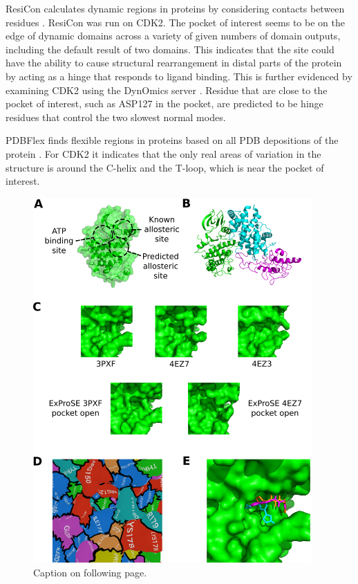ResiCon calculates dynamic regions in proteins by considering contacts between residues \cite{Dziubinski2016}.
ResiCon was run on CDK2.
The pocket of interest seems to be on the edge of dynamic domains across a variety of given numbers of domain outputs, including the default result of two domains.
This indicates that the site could have the ability to cause structural rearrangement in distal parts of the protein by acting as a hinge that responds to ligand binding.
This is further evidenced by examining CDK2 using the DynOmics server \cite{Li2017}.
Residue that are close to the pocket of interest, such as ASP127 in the pocket, are predicted to be hinge residues that control the two slowest normal modes.

PDBFlex finds flexible regions in proteins based on all PDB depositions of the protein \cite{Hrabe2016}.
For CDK2 it indicates that the only real areas of variation in the structure is around the \textalpha C-helix and the T-loop, which is near the pocket of interest.


\begin{figure}
\centering

\includegraphics[width=0.95\textwidth]{figures/cdk2_structure/cdk2_structure}

\caption[Conformational variability and virtual screening of CDK2]
{Caption on following page.}

\label{fig:cdk2_structure}
\end{figure}

